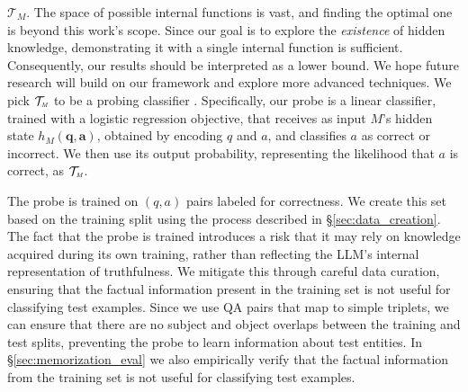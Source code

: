 $\boldsymbol{\mathcal{T}}_{M}.$ The space of possible internal functions is vast, and finding the optimal one is beyond this work's scope.
Since our goal is to explore the \textit{existence} of hidden knowledge, demonstrating it with a single internal function is sufficient. Consequently, our results should be interpreted as a lower bound. We hope future research will build on our framework and explore more advanced techniques. We pick $\mathcal{T}_{\text{\tiny \emph{M}}}$ to be a probing classifier \citep{ettinger-etal-2016-probing,belinkov-etal-2017-neural,hupkes2018jair, belinkov2019tacl}. Specifically, our probe is a linear  classifier, trained with a logistic regression objective, that receives as input $M$'s hidden state $h_M\mathbf{(q,a)}$, obtained by encoding $q$ and $a$, and classifies $a$ as correct or incorrect. We then use its output probability, representing the likelihood that $a$ is correct, as $\mathcal{T}_{\text{\tiny \emph{M}}}$. 

The probe is trained on $(q,a)$ pairs labeled for correctness. 
We create this set based on the training split using the process described in \S \ref{sec:data_creation}. The fact that the probe is trained introduces a risk that it may rely on knowledge acquired during its own training, rather than reflecting the LLM's internal representation of truthfulness. We mitigate this through careful data curation, ensuring that the factual information present in the training set is not useful for classifying test examples. 
Since we use QA pairs that map to simple \emph{} triplets, 
we can ensure that there are no subject and object overlaps between the training and test splits, preventing the probe to learn information about test entities.
In \S \ref{sec:memorization_eval} we also empirically verify that the factual information from the training set is not useful for classifying test examples.



